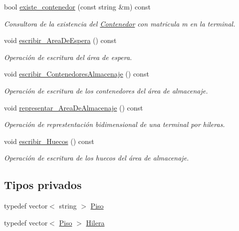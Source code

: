 \begin{DoxyCompactItemize}
bool \hyperlink{class_terminal_a6b2cb1486f78ef82f759fb071bb1049d}{existe\+\_\+contenedor} (const string \&m) const
\begin{DoxyCompactList}\small\item\em Consultora de la existencia del \hyperlink{class_contenedor}{Contenedor} con matricula {\itshape m} en la terminal. \end{DoxyCompactList}\item 
void \hyperlink{class_terminal_a3da2635443b21d89e5fecc47153a888f}{escribir\+\_\+\+Area\+De\+Espera} () const
\begin{DoxyCompactList}\small\item\em Operación de escritura del área de espera. \end{DoxyCompactList}\item 
void \hyperlink{class_terminal_a24c74e2dd8c8e41452a7e890bc925f0e}{escribir\+\_\+\+Contenedores\+Almacenaje} () const
\begin{DoxyCompactList}\small\item\em Operación de escritura de los contenedores del área de almacenaje. \end{DoxyCompactList}\item 
void \hyperlink{class_terminal_a32d375e8cecdafbbf0a291f646456dd6}{representar\+\_\+\+Area\+De\+Almacenaje} () const
\begin{DoxyCompactList}\small\item\em Operación de represtentación bidimensional de una terminal por hileras. \end{DoxyCompactList}\item 
void \hyperlink{class_terminal_afbfd7c045961e20718f9b5ffa1a31aa1}{escribir\+\_\+\+Huecos} () const
\begin{DoxyCompactList}\small\item\em Operación de escritura de los huecos del área de almacenaje. \end{DoxyCompactList}\end{DoxyCompactItemize}
\subsection*{Tipos privados}
\begin{DoxyCompactItemize}
\item 
typedef vector$<$ string $>$ \hyperlink{class_terminal_a06c48b71c1afa0f6cb9ec885fe53117c}{Piso}
\item 
typedef vector$<$ \hyperlink{class_terminal_a06c48b71c1afa0f6cb9ec885fe53117c}{Piso} $>$ \hyperlink{class_terminal_aba85ff115aaa21fc79271673ad4231b9}{Hilera}
\end{DoxyCompactItemize}
